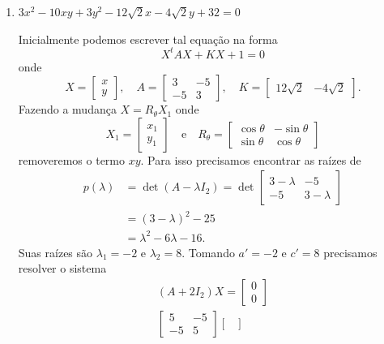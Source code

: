 \begin{exemplos}
\begin{enumerate}
    \item $3x^2 - 10xy + 3y^2 - 12\sqrt{2}x - 4\sqrt{2}y + 32 = 0$
    \begin{solucao}
      Inicialmente podemos escrever tal equação na forma
      \[
        X^t A X + KX + 1 = 0
      \]
      onde
      \[
        X = \begin{bmatrix}
          x\\y
        \end{bmatrix}, \quad A = \begin{bmatrix}
          3 & -5\\
          -5 & 3
        \end{bmatrix},\quad K = \begin{bmatrix}
          12\sqrt{2} & -4\sqrt{2}
        \end{bmatrix}.
      \]
      Fazendo a mudança $X = R_\theta X_1$ onde
      \[
        X_1 = \begin{bmatrix}
          x_1 \\y_1
        \end{bmatrix} \quad\mbox{e}\quad R_\theta = \begin{bmatrix}
          \cos\theta & -\sin\theta\\
          \sin\theta & \cos\theta
        \end{bmatrix}
      \]
      removeremos o termo $xy$. Para isso precisamos encontrar as raízes de
      \begin{align*}
        p(\lambda) &= \det (A - \lambda I_2) = \det \begin{bmatrix}
          3 - \lambda & -5\\
          -5 & 3 - \lambda
        \end{bmatrix}\\ &= (3 - \lambda)^2 - 25\\ &= \lambda^2 - 6\lambda - 16.
      \end{align*}
      Suas raízes são $\lambda_1 = -2$ e $\lambda_2 = 8$. Tomando $a' = -2$ e $c' = 8$ precisamos resolver o sistema
      \begin{align*}
        (A + 2I_2)X = \begin{bmatrix}
          0\\0
        \end{bmatrix}\\
        \begin{bmatrix}
          5 & -5\\
          -5 & 5
        \end{bmatrix} \begin{bmatrix}

\end{bmatrix}
\end{align*}
\end{solucao}
\end{enumerate}
\end{exemplos}

